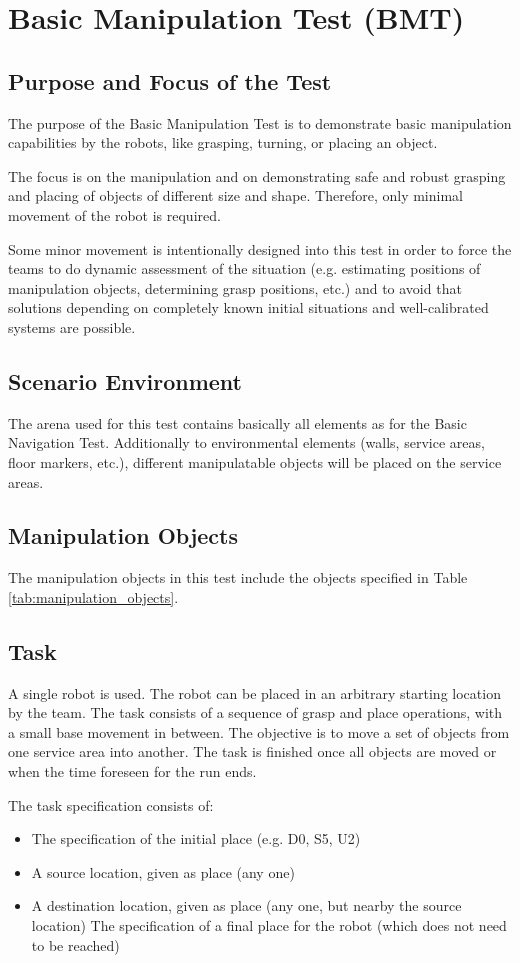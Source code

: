 \section{Basic Manipulation Test (BMT)}

\subsection{Purpose and Focus of the Test}
The purpose of the Basic Manipulation Test is to demonstrate basic manipulation capabilities by the robots, like grasping, turning, or placing an object.
\par
The focus is on the manipulation and on demonstrating safe and robust grasping and placing of objects of different size and shape. Therefore, only minimal movement of the robot is required. 
\par
Some minor movement is intentionally designed into this test in order to force the teams to do dynamic assessment of the situation (e.g. estimating positions of manipulation objects, determining grasp positions, etc.) and to avoid that solutions depending on completely known initial situations and well-calibrated systems are possible. 

\subsection{Scenario Environment}
The arena used for this test contains basically all elements as for the Basic Navigation Test. Additionally to environmental elements (walls, service areas, floor markers, etc.), different manipulatable objects will be placed on the service areas. 

\subsection{Manipulation Objects}
The manipulation objects in this test include the objects specified in Table \ref{tab:manipulation_objects}.

\subsection{Task}
A single robot is used. The robot can be placed in an arbitrary starting location by the team. The task consists of a sequence of grasp and place operations, with a small base movement in between. The objective is to move a set of objects from one service area into another. The task is finished once all objects are moved or when the time foreseen for the run ends. 
\par
The task specification consists of: 
\begin{itemize}
	\item The specification of the initial place (e.g. D0, S5, U2)
	\item A source location, given as place (any one)
	\item A destination location, given as place (any one, but nearby the source location)
The specification of a final place for the robot (which does not need to be reached)
\end{itemize}

